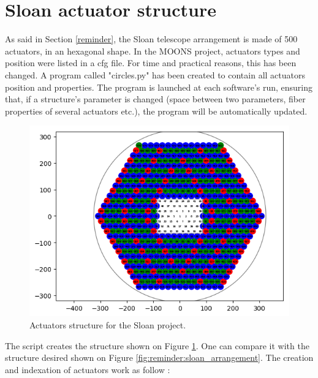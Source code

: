 \section{Sloan actuator structure} \label{circles}

As said in Section \ref{reminder}, the Sloan telescope arrangement is made of 500 actuators, in an hexagonal shape. In the MOONS project, actuators types and position were listed in a cfg file. For time and practical reasons, this has been changed. A program called "circles.py" has been created to contain all actuators position and properties. The program is launched at each software's run, ensuring that, if a structure's parameter is changed (space between two parameters, fiber properties of several actuators etc.), the program will be automatically updated.

\begin{figure}[h]
\begin{center}
	\includegraphics[width=\textwidth]{circles/sloan_arrangement.png}
	\caption{Actuators structure for the Sloan project.}
	\label{fig:sloan:arrangement}
\end{center}
\end{figure}

The script creates the structure shown on Figure \ref{fig:sloan:arrangement}. One can compare it with the structure desired shown on Figure \ref{fig:reminder:sloan_arrangement}. The creation and indexation of actuators work as follow :

